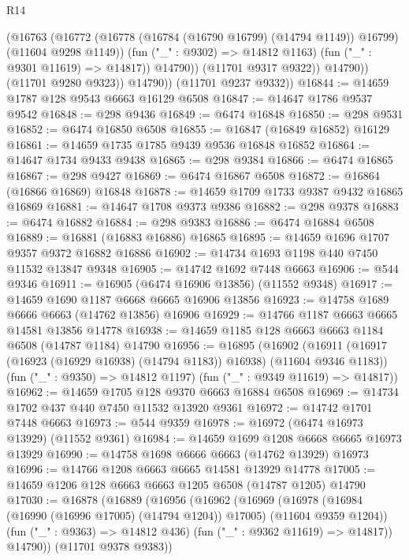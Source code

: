 \begin{lexlean}{R14}
\begin{coremodule}
{{{{{{{{{{{{{{{{{{{{{{{{{{{{{{{{{{{{{{{{{{{{{{{{{{{{{{{{{{{{{{{{{{{{{{{{{{{{{{{{{{                      (@16763
                        (@16772
                          (@16778 (@16784 (@16790 @16799) (@14794 @1149)) @16799)
                          (@11604 @9298 @1149))
                        (fun ("_" : @9302) => @14812 @1163)
                        (fun ("_" : @9301 @11619) => @14817))
                      @14790))
                  (@11701 @9317 @9322))
                @14790))
            (@11701 @9280 @9323))
          @14790))
      (@11701 @9237 @9332))
@16844 := @14659 @1787 @128 @9543 @6663 @16129 @6508
@16847 := @14647 @1786 @9537 @9542
@16848 := @298 @9436
@16849 := @6474 @16848
@16850 := @298 @9531
@16852 := @6474 @16850 @6508
@16855 := @16847 (@16849 @16852) @16129
@16861 := @14659 @1735 @1785 @9439 @9536 @16848 @16852
@16864 := @14647 @1734 @9433 @9438
@16865 := @298 @9384
@16866 := @6474 @16865
@16867 := @298 @9427
@16869 := @6474 @16867 @6508
@16872 := @16864 (@16866 @16869) @16848
@16878 := @14659 @1709 @1733 @9387 @9432 @16865 @16869
@16881 := @14647 @1708 @9373 @9386
@16882 := @298 @9378
@16883 := @6474 @16882
@16884 := @298 @9383
@16886 := @6474 @16884 @6508
@16889 := @16881 (@16883 @16886) @16865
@16895 := @14659 @1696 @1707 @9357 @9372 @16882 @16886
@16902 := @14734 @1693 @1198 @440 @7450 @11532 @13847 @9348
@16905 := @14742 @1692 @7448 @6663
@16906 := @544 @9346
@16911 := @16905 (@6474 @16906 @13856) (@11552 @9348)
@16917 := @14659 @1690 @1187 @6668 @6665 @16906 @13856
@16923 := @14758 @1689 @6666 @6663 (@14762 @13856) @16906
@16929 := @14766 @1187 @6663 @6665 @14581 @13856 @14778
@16938 := @14659 @1185 @128 @6663 @6663 @1184 @6508 (@14787 @1184) @14790
@16956 := @16895
    (@16902
      (@16911 (@16917 (@16923 (@16929 @16938) (@14794 @1183)) @16938) (@11604 @9346 @1183))
      (fun ("_" : @9350) => @14812 @1197)
      (fun ("_" : @9349 @11619) => @14817))
@16962 := @14659 @1705 @128 @9370 @6663 @16884 @6508
@16969 := @14734 @1702 @437 @440 @7450 @11532 @13920 @9361
@16972 := @14742 @1701 @7448 @6663
@16973 := @544 @9359
@16978 := @16972 (@6474 @16973 @13929) (@11552 @9361)
@16984 := @14659 @1699 @1208 @6668 @6665 @16973 @13929
@16990 := @14758 @1698 @6666 @6663 (@14762 @13929) @16973
@16996 := @14766 @1208 @6663 @6665 @14581 @13929 @14778
@17005 := @14659 @1206 @128 @6663 @6663 @1205 @6508 (@14787 @1205) @14790
@17030 := @16878
    (@16889
      (@16956
        (@16962
          (@16969
            (@16978 (@16984 (@16990 (@16996 @17005) (@14794 @1204)) @17005) (@11604 @9359 @1204))
            (fun ("_" : @9363) => @14812 @436)
            (fun ("_" : @9362 @11619) => @14817))
          @14790))
      (@11701 @9378 @9383))
}}}}}}}}}}}}}}}}}}}}}}}}}}}}}}}}}}}}}}}}}}}}}}}}}}}}}}}}}}}}}}}}}}}}}}}}}}}}}}}}}}
\end{coremodule}
\end{lexlean}
